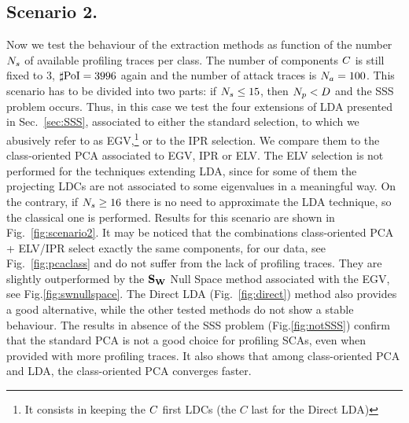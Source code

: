 \subsection{Scenario 2.}

Now we test the behaviour of the extraction methods as function of the number $N_{s}$ of available profiling traces per class. The number of components $C$ is still fixed to 3, $\sharp\mathrm{PoI}=3996$ again and the number of attack traces is $N_a=100$. This scenario has to be divided into two parts: if $N_{s}\leq 15$, then $N_p<D$ and the SSS problem occurs. Thus, in this case we test the four extensions of LDA presented in Sec.~\ref{sec:SSS}, associated to either the standard selection, to which we abusively refer to as EGV,\footnote{It consists in keeping the $C$ first LDCs (the $C$ last for the Direct LDA)}
or to the IPR selection.  We compare them to the class-oriented PCA associated to EGV, IPR or ELV. The ELV selection is not performed for the techniques extending LDA, since for some of them the projecting LDCs are not associated to some eigenvalues in a meaningful way. On the contrary, if $N_{s} \geq 16$ there is no need to approximate the LDA technique, so the classical one is performed. Results for this scenario are shown in Fig.~\ref{fig:scenario2}. It may be noticed that the combinations class-oriented PCA + ELV/IPR select exactly the same components, for our data, see Fig.~\ref{fig:pcaclass} and do not suffer from the lack of profiling traces. They are slightly outperformed by the $\textbf{S}_{\textbf{W}}$ Null Space method associated with the EGV, see Fig.\ref{fig:swnullspace}. The Direct LDA (Fig.~\ref{fig:direct}) method also provides a good alternative, while the other tested methods do not show a stable behaviour. The results in absence of the SSS problem (Fig.\ref{fig:notSSS}) confirm that the standard PCA is not a good choice for profiling SCAs, even when provided with more profiling traces. It also shows that among class-oriented PCA and LDA, the class-oriented PCA converges faster.



